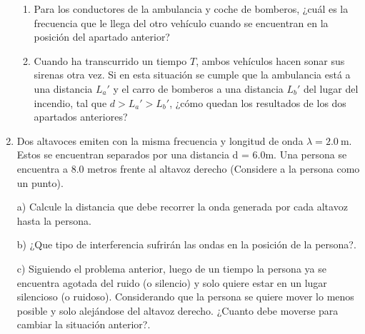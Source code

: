 \documentclass[letterpaper,11pt]{article}
\begin{document}
\begin{enumerate}
\begin{enumerate}
    \item Para los conductores de la ambulancia y coche de bomberos, ¿cuál es la frecuencia que le llega del otro vehículo cuando se encuentran en la posición del apartado anterior?

    \item Cuando ha transcurrido un tiempo $T$, ambos vehículos hacen sonar sus sirenas otra vez. Si en esta situación se cumple que la ambulancia está a una distancia $L_a'$ y el carro de bomberos a una distancia $L_b'$ del lugar del incendio, tal que $d>L_a'> L_b'$, ¿cómo quedan los resultados de los dos apartados anteriores?
\end{enumerate}

\item Dos altavoces emiten con la misma frecuencia  y longitud de onda $\lambda=\SI{2.0}{\m}$. Estos se encuentran separados por una distancia d = 6.0m.
Una persona se encuentra a 8.0 metros frente al altavoz derecho (Considere a la persona como un punto).

a) Calcule la distancia que debe recorrer la onda generada por cada altavoz hasta la persona.

b) ¿Que tipo de interferencia sufrirán las ondas en la posición de la persona?.

c) Siguiendo el problema anterior, luego de un tiempo la persona ya se encuentra agotada del ruido (o silencio) y solo quiere estar en un lugar silencioso (o ruidoso).
Considerando que la persona se quiere mover lo menos posible y solo alejándose del altavoz derecho. ¿Cuanto debe moverse para cambiar la situación anterior?.


\end{enumerate}
\end{document}
